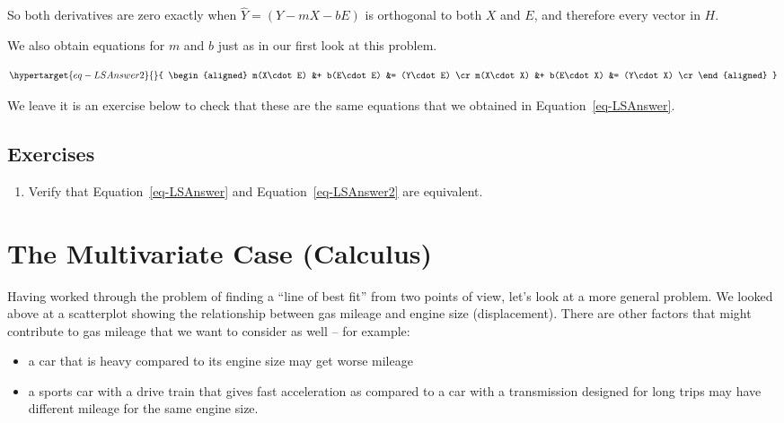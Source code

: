 \documentclass[
  11pt,
  letterpaper,
]{scrbook}
\providecommand{\tightlist}{%
  \setlength{\itemsep}{0pt}\setlength{\parskip}{0pt}}\usepackage{longtable,booktabs,array}
\theoremstyle{plain}
\theoremstyle{plain}
\theoremstyle{remark}
\begin{document}
So both derivatives are zero exactly when \(\hat{Y}=(Y-mX-bE)\) is
orthogonal to both \(X\) and \(E\), and therefore every vector in \(H\).

We also obtain equations for \(m\) and \(b\) just as in our first look
at this problem.

\begin{equation}\protect\hypertarget{eq-LSAnswer2}{}{ \begin{aligned} m(X\cdot E) &+ b(E\cdot E) &= (Y\cdot E) \cr
m(X\cdot X) &+ b(E\cdot X) &= (Y\cdot X) \cr \end{aligned}
}\label{eq-LSAnswer2}\end{equation}

We leave it is an exercise below to check that these are the same
equations that we obtained in Equation~\ref{eq-LSAnswer}.

\hypertarget{exercises}{%
\subsection{Exercises}\label{exercises}}

\begin{enumerate}
\def\labelenumi{\arabic{enumi}.}
\tightlist
\item
  Verify that Equation~\ref{eq-LSAnswer} and Equation~\ref{eq-LSAnswer2}
  are equivalent.
\end{enumerate}

\hypertarget{sec-Multivariate-calculus}{%
\section{The Multivariate Case
(Calculus)}\label{sec-Multivariate-calculus}}

Having worked through the problem of finding a ``line of best fit'' from
two points of view, let's look at a more general problem. We looked
above at a scatterplot showing the relationship between gas mileage and
engine size (displacement). There are other factors that might
contribute to gas mileage that we want to consider as well -- for
example:

\begin{itemize}
\tightlist
\item
  a car that is heavy compared to its engine size may get worse mileage
\item
  a sports car with a drive train that gives fast acceleration as
  compared to a car with a transmission designed for long trips may have
  different mileage for the same engine size.
\end{itemize}
\end{document}
